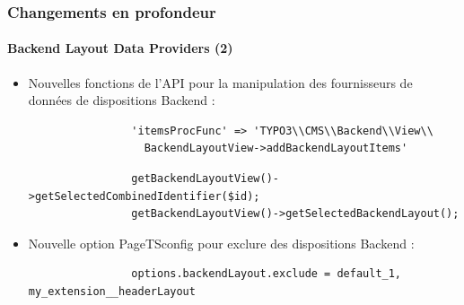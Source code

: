 
\begin{frame}[fragile]
	\frametitle{Changements en profondeur}
	\framesubtitle{Backend Layout Data Providers (2)}

	\begin{itemize}
		\item Nouvelles fonctions de l'API pour la manipulation des fournisseurs de données de dispositions Backend :

			\begin{lstlisting}
				'itemsProcFunc' => 'TYPO3\\CMS\\Backend\\View\\
				  BackendLayoutView->addBackendLayoutItems'
			\end{lstlisting}

			\begin{lstlisting}
				getBackendLayoutView()->getSelectedCombinedIdentifier($id);
				getBackendLayoutView()->getSelectedBackendLayout();
			\end{lstlisting}

		\item Nouvelle option PageTSconfig pour exclure des dispositions Backend :

			\begin{lstlisting}
				options.backendLayout.exclude = default_1, my_extension__headerLayout
			\end{lstlisting}

	\end{itemize}

\end{frame}


